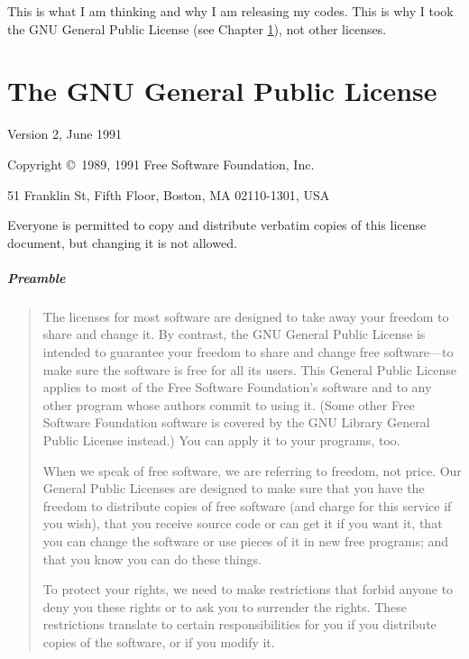 \documentclass{book}
\begin{document}
This is what I am thinking and why I am releasing my codes.
This is why I took the GNU General Public License
(see Chapter \ref{chp:GPL}), not other licenses.


\newpage

\appendix

{\small
\chapter{The GNU General Public License}
\label{chp:GPL}
\begin{center}
{\parindent 0in

Version 2, June 1991

Copyright \copyright\ 1989, 1991 Free Software Foundation, Inc.

\bigskip

51 Franklin St, Fifth Floor, Boston, MA  02110-1301, USA

\bigskip

Everyone is permitted to copy and distribute verbatim copies
of this license document, but changing it is not allowed.
}

\paragraph{Preamble}
\begin{quote}
The licenses for most software are designed to take away your freedom to
share and change it.  By contrast, the GNU General Public License is
intended to guarantee your freedom to share and change free software---to
make sure the software is free for all its users.  This General Public
License applies to most of the Free Software Foundation's software and to
any other program whose authors commit to using it.  (Some other Free
Software Foundation software is covered by the GNU Library General Public
License instead.)  You can apply it to your programs, too.

When we speak of free software, we are referring to freedom, not price.
Our General Public Licenses are designed to make sure that you have the
freedom to distribute copies of free software (and charge for this service
if you wish), that you receive source code or can get it if you want it,
that you can change the software or use pieces of it in new free programs;
and that you know you can do these things.

To protect your rights, we need to make restrictions that forbid anyone to
deny you these rights or to ask you to surrender the rights.  These
restrictions translate to certain responsibilities for you if you
distribute copies of the software, or if you modify it.


\end{quote}
\end{center}}
\end{document}
